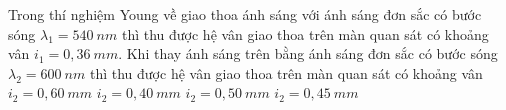 \begin{vidu}%
Trong thí nghiệm Young về giao thoa ánh sáng với ánh sáng đơn sắc có bước sóng ${{\lambda}_{1}}=540\ nm $ thì thu được hệ vân giao thoa trên màn quan sát có khoảng vân ${i_1}=0,36\ mm $. Khi thay ánh sáng trên bằng ánh sáng đơn sắc có bước sóng ${{\lambda}_{2}}=600\ nm $ thì thu được hệ vân giao thoa trên màn quan sát có khoảng vân
\choice
{${i_2}=0,60\ mm $}
{\True ${i_2}=0,40\ mm $}
{${i_2}=0,50\ mm $}
{${i_2}=0,45\ mm $}
\end{vidu} %


